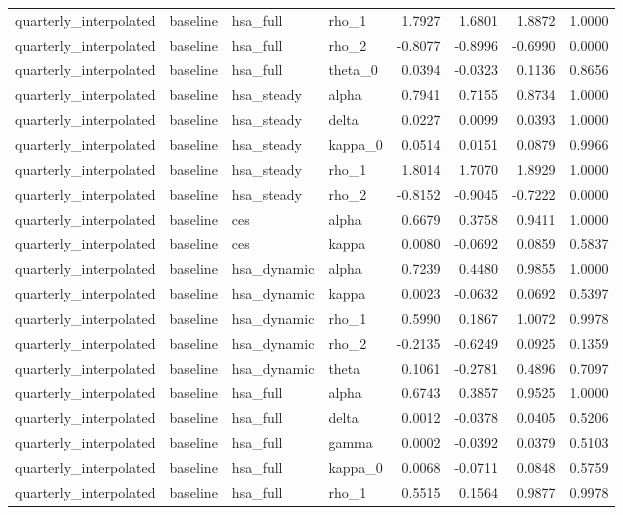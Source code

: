\begin{tabular}{llllrrrr}
quarterly\_interpolated & baseline & hsa\_full & rho\_1 & 1.7927 & 1.6801 & 1.8872 & 1.0000 \\
quarterly\_interpolated & baseline & hsa\_full & rho\_2 & -0.8077 & -0.8996 & -0.6990 & 0.0000 \\
quarterly\_interpolated & baseline & hsa\_full & theta\_0 & 0.0394 & -0.0323 & 0.1136 & 0.8656 \\
quarterly\_interpolated & baseline & hsa\_steady & alpha & 0.7941 & 0.7155 & 0.8734 & 1.0000 \\
quarterly\_interpolated & baseline & hsa\_steady & delta & 0.0227 & 0.0099 & 0.0393 & 1.0000 \\
quarterly\_interpolated & baseline & hsa\_steady & kappa\_0 & 0.0514 & 0.0151 & 0.0879 & 0.9966 \\
quarterly\_interpolated & baseline & hsa\_steady & rho\_1 & 1.8014 & 1.7070 & 1.8929 & 1.0000 \\
quarterly\_interpolated & baseline & hsa\_steady & rho\_2 & -0.8152 & -0.9045 & -0.7222 & 0.0000 \\
quarterly\_interpolated & baseline & ces & alpha & 0.6679 & 0.3758 & 0.9411 & 1.0000 \\
quarterly\_interpolated & baseline & ces & kappa & 0.0080 & -0.0692 & 0.0859 & 0.5837 \\
quarterly\_interpolated & baseline & hsa\_dynamic & alpha & 0.7239 & 0.4480 & 0.9855 & 1.0000 \\
quarterly\_interpolated & baseline & hsa\_dynamic & kappa & 0.0023 & -0.0632 & 0.0692 & 0.5397 \\
quarterly\_interpolated & baseline & hsa\_dynamic & rho\_1 & 0.5990 & 0.1867 & 1.0072 & 0.9978 \\
quarterly\_interpolated & baseline & hsa\_dynamic & rho\_2 & -0.2135 & -0.6249 & 0.0925 & 0.1359 \\
quarterly\_interpolated & baseline & hsa\_dynamic & theta & 0.1061 & -0.2781 & 0.4896 & 0.7097 \\
quarterly\_interpolated & baseline & hsa\_full & alpha & 0.6743 & 0.3857 & 0.9525 & 1.0000 \\
quarterly\_interpolated & baseline & hsa\_full & delta & 0.0012 & -0.0378 & 0.0405 & 0.5206 \\
quarterly\_interpolated & baseline & hsa\_full & gamma & 0.0002 & -0.0392 & 0.0379 & 0.5103 \\
quarterly\_interpolated & baseline & hsa\_full & kappa\_0 & 0.0068 & -0.0711 & 0.0848 & 0.5759 \\
quarterly\_interpolated & baseline & hsa\_full & rho\_1 & 0.5515 & 0.1564 & 0.9877 & 0.9978 \\

\end{tabular}

